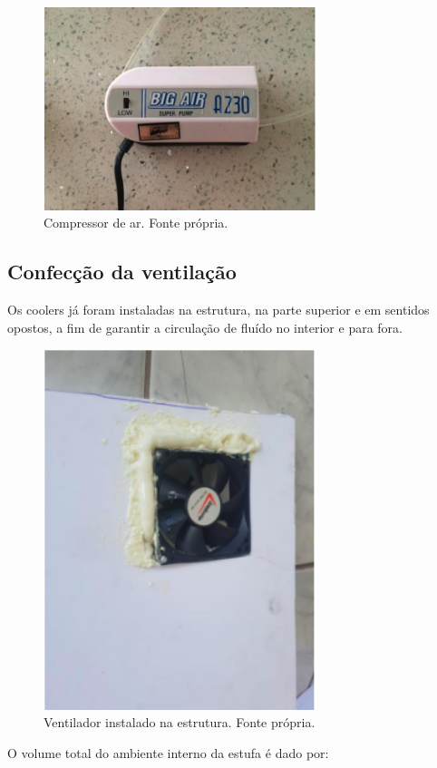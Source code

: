\begin{figure}[H]
	\centering
	\includegraphics[width=8cm]{figuras/compressor.png}
	\caption{Compressor de ar. Fonte própria.}
	\label{compressor}
\end{figure}


\subsection{Confecção da ventilação}

Os coolers já foram instaladas na estrutura, na parte superior e em sentidos opostos, a fim de garantir a circulação de fluído no interior e para fora.

\begin{figure}[H]
	\centering
	\includegraphics[width=8cm]{figuras/ventilador.png}
	\caption{Ventilador instalado na estrutura. Fonte própria.}
	\label{ventilador}
\end{figure}

O volume total do ambiente interno da estufa é dado por:

